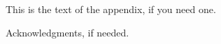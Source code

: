 \documentclass{sigplanconf}
\begin{document}
This is the text of the appendix, if you need one.

\acks

Acknowledgments, if needed.


\makeatletter
  \def\@seccntformat#1{Appendix~\csname the#1\endcsname:\quad}
\makeatother




\end{document}
